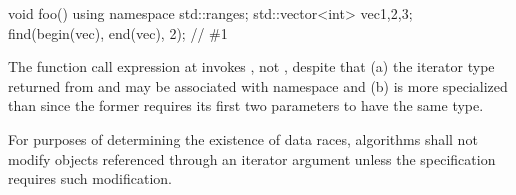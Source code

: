 \begin{example}
\begin{codeblock}
void foo() {
  using namespace std::ranges;
  std::vector<int> vec{1,2,3};
  find(begin(vec), end(vec), 2);        // \#1
}
\end{codeblock}
The function call expression at  invokes ,
not , despite that
(a) the iterator type returned from  and 
may be associated with namespace  and
(b)  is more specialized than
 since the former requires
its first two parameters to have the same type.
\end{example}

\pnum
For purposes of determining the existence of data races,
algorithms shall not modify objects referenced through an iterator argument
unless the specification requires such modification.

